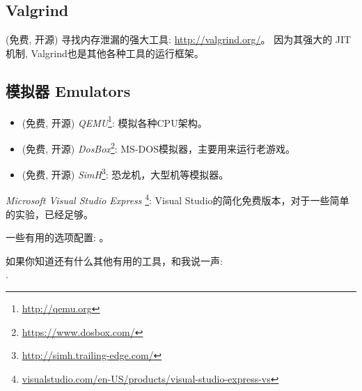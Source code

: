 \documentclass[UTF8,nofonts]{ctexart}
\begin{document}
\subsection{Valgrind}

(免费, 开源) 寻找内存泄漏的强大工具: \url{http://valgrind.org/}。
因为其强大的 \ac{JIT} 机制, Valgrind也是其他各种工具的运行框架。


\subsection{模拟器 Emulators}

\begin{itemize}
\item (免费, 开源) \emph{QEMU}\footnote{\url{http://qemu.org}}: 模拟各种CPU架构。

\item (免费, 开源) \emph{DosBox}\footnote{\url{https://www.dosbox.com/}}: MS-DOS模拟器，主要用来运行老游戏。 

\item (免费, 开源) \emph{SimH}\footnote{\url{http://simh.trailing-edge.com/}}: 恐龙机，大型机等模拟器。
\end{itemize}


\emph{Microsoft Visual Studio Express}
\footnote{\href{http://go.yurichev.com/17034}{visualstudio.com/en-US/products/visual-studio-express-vs}}:
Visual Studio的简化免费版本，对于一些简单的实验，已经足够。

一些有用的选项配置: 。


如果你知道还有什么其他有用的工具，和我说一声:\\
\TT{\EMAILS}.
\end{document}
